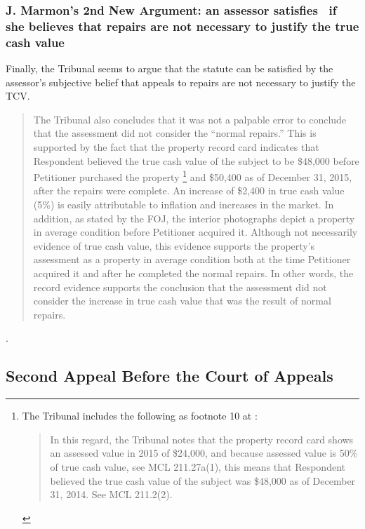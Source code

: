 \documentclass[12pt,\documentclassflag]{michiganCourtOfAppealsBrief}
\begin{document}
\subsubsection{J. Marmon's 2nd New Argument: an assessor satisfies \mathieuGast\ if she believes that repairs are not necessary to justify the true cash value}

 Finally, the Tribunal seems to argue that the statute can be satisfied by the assessor's subjective belief that appeals to repairs are not necessary to justify the TCV.

  \begin{quote}
    The Tribunal also concludes that it was not a palpable error to conclude that the
assessment did not consider the ``normal repairs.'' This is supported by the fact that the
property record card indicates that Respondent believed the true cash value of the
subject to be \$48,000 before Petitioner purchased the property
\footnote{The Tribunal includes the following as footnote 10 at :
  \begin{quote}
    In this regard, the Tribunal notes that the property record card shows an assessed value in 2015 of
\$24,000, and because assessed value is 50\% of true cash value, see MCL 211.27a(1), this means that
Respondent believed the true cash value of the subject was \$48,000 as of December 31, 2014. See
MCL 211.2(2).
\end{quote}
}
and \$50,400 as of
December 31, 2015, after the repairs were complete. An increase of \$2,400 in true
cash value (5\%) is easily attributable to inflation and increases in the market. In
addition, as stated by the FOJ, the interior photographs depict a property in average
condition before Petitioner acquired it. Although not necessarily evidence of true cash
value, this evidence supports the property's assessment as a property in average
condition both at the time Petitioner acquired it and after he completed the normal
repairs. In other words, the record evidence supports the conclusion that the
assessment did not consider the increase in true cash value that was the result of
normal repairs.
\end{quote}
.

\subsection{Second Appeal Before the Court of Appeals}
\end{document}
